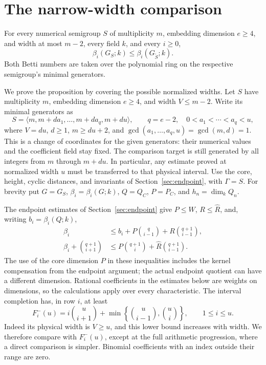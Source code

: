 \section{The narrow-width comparison}\label{sec:width}

\begin{proposition}\label{prop:narrow}
For every numerical semigroup $S$ of multiplicity $m$, embedding
dimension $e\ge4$, and width at most $m-2$, every field $k$, and every $i\ge0$,
\[
 \beta_i(G_S;k)\le\beta_i(G_{\widetilde S};k).
\]
Both Betti numbers are taken over the polynomial ring on the respective
semigroup's minimal generators.
\end{proposition}

We prove the proposition by covering the possible normalized widths.
Let $S$ have multiplicity $m$, embedding dimension $e\ge4$, and width
$V\le m-2$.  Write its minimal generators as
\[
 S=\langle m,m+da_1,\ldots,m+da_q,m+du\rangle,
 \qquad q=e-2,\quad 0<a_1<\cdots<a_q<u,
\]
where $V=du$, $d\ge1$, $m\ge du+2$, and
$\gcd(a_1,\ldots,a_q,u)=\gcd(m,d)=1$.
This is a change of coordinates for the given generators: their
numerical values and the coefficient field stay fixed.  The comparison
target is still generated by all integers from $m$ through $m+du$.
In particular, any estimate proved at normalized width $u$ must be
transferred to that physical interval.
Use the core, height, cyclic distances, and invariants of
Section~\ref{sec:endpoint}, with $\Gamma=S$.
For brevity put $G=G_S$, $\beta_i=\beta_i(G;k)$,
$Q=Q_C$, $P=P_C$, and $h_n=\dim_k Q_n$.

The endpoint estimates of Section~\ref{sec:endpoint} give $P\le W$,
$R\le\widehat R$, and, writing $b_i=\beta_i(Q;k)$,
\begin{align}
 \beta_i&\le b_i+P\binom q{i-1}+R\binom{q+1}{i-1},\label{eq:width-transfer}\\
 \beta_i+\binom{q+1}{i+1}
 &\le P\binom{q+1}i+\widehat R\binom{q+1}{i-1}.
 \label{eq:width-rows}
\end{align}
The use of the core dimension $P$ in these inequalities includes the
kernel compensation from the endpoint argument; the actual endpoint
quotient can have a different dimension.  Rational coefficients in the
estimates below are weights on dimensions, so the calculations apply
over every characteristic.
The interval completion has, in row $i$, at least
\[
 F_i^-(u)=i\binom u{i+1}
       +\min\left\{\binom u{i-1},\binom ui\right\},
 \qquad 1\le i\le u.
\]
Indeed its physical width is $V\ge u$, and this lower bound increases
with width.  We therefore compare with $F_i^-(u)$, except at the full
arithmetic progression, where a direct comparison is simpler.
Binomial coefficients with an index outside their range are zero.

